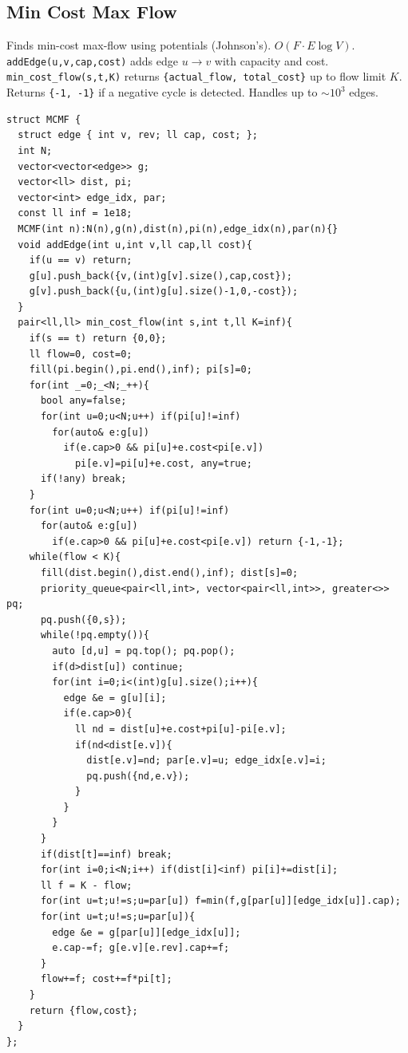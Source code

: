 \subsection{Min Cost Max Flow}
Finds min-cost max-flow using potentials (Johnson's). $O(F \cdot E \log V)$. \texttt{addEdge(u,v,cap,cost)} adds edge $u \to v$ with capacity and cost. \texttt{min\_cost\_flow(s,t,K)} returns \texttt{\{actual\_flow, total\_cost\}} up to flow limit $K$. Returns \texttt{\{-1, -1\}} if a negative cycle is detected. Handles up to $\sim 10^3$ edges.
\begin{verbatim}
struct MCMF {
  struct edge { int v, rev; ll cap, cost; };
  int N;
  vector<vector<edge>> g;
  vector<ll> dist, pi;
  vector<int> edge_idx, par;
  const ll inf = 1e18;
  MCMF(int n):N(n),g(n),dist(n),pi(n),edge_idx(n),par(n){}
  void addEdge(int u,int v,ll cap,ll cost){
    if(u == v) return;
    g[u].push_back({v,(int)g[v].size(),cap,cost});
    g[v].push_back({u,(int)g[u].size()-1,0,-cost});
  }
  pair<ll,ll> min_cost_flow(int s,int t,ll K=inf){
    if(s == t) return {0,0};
    ll flow=0, cost=0;
    fill(pi.begin(),pi.end(),inf); pi[s]=0;
    for(int _=0;_<N;_++){
      bool any=false;
      for(int u=0;u<N;u++) if(pi[u]!=inf)
        for(auto& e:g[u])
          if(e.cap>0 && pi[u]+e.cost<pi[e.v])
            pi[e.v]=pi[u]+e.cost, any=true;
      if(!any) break;
    }
    for(int u=0;u<N;u++) if(pi[u]!=inf)
      for(auto& e:g[u])
        if(e.cap>0 && pi[u]+e.cost<pi[e.v]) return {-1,-1};
    while(flow < K){
      fill(dist.begin(),dist.end(),inf); dist[s]=0;
      priority_queue<pair<ll,int>, vector<pair<ll,int>>, greater<>> pq;
      pq.push({0,s});
      while(!pq.empty()){
        auto [d,u] = pq.top(); pq.pop();
        if(d>dist[u]) continue;
        for(int i=0;i<(int)g[u].size();i++){
          edge &e = g[u][i];
          if(e.cap>0){
            ll nd = dist[u]+e.cost+pi[u]-pi[e.v];
            if(nd<dist[e.v]){
              dist[e.v]=nd; par[e.v]=u; edge_idx[e.v]=i;
              pq.push({nd,e.v});
            }
          }
        }
      }
      if(dist[t]==inf) break;
      for(int i=0;i<N;i++) if(dist[i]<inf) pi[i]+=dist[i];
      ll f = K - flow;
      for(int u=t;u!=s;u=par[u]) f=min(f,g[par[u]][edge_idx[u]].cap);
      for(int u=t;u!=s;u=par[u]){
        edge &e = g[par[u]][edge_idx[u]];
        e.cap-=f; g[e.v][e.rev].cap+=f;
      }
      flow+=f; cost+=f*pi[t];
    }
    return {flow,cost};
  }
};
\end{verbatim}
